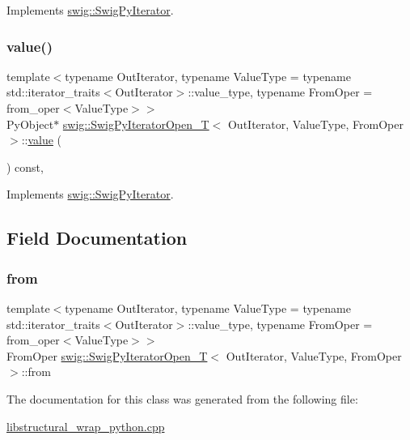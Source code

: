 Implements \hyperlink{structswig_1_1_swig_py_iterator_a8881170ecd7d9e674ef37eb16b2c9a7a}{swig\+::\+Swig\+Py\+Iterator}.

\mbox{\label{classswig_1_1_swig_py_iterator_open___t_aa219f4e29ccea747d23fdb68705a530d}} 
\subsubsection{\texorpdfstring{value()}{value()}}
{\footnotesize\ttfamily template$<$typename Out\+Iterator, typename Value\+Type = typename std\+::iterator\+\_\+traits$<$\+Out\+Iterator$>$\+::value\+\_\+type, typename From\+Oper = from\+\_\+oper$<$\+Value\+Type$>$$>$ \\
Py\+Object$\ast$ \hyperlink{classswig_1_1_swig_py_iterator_open___t}{swig\+::\+Swig\+Py\+Iterator\+Open\+\_\+T}$<$ Out\+Iterator, Value\+Type, From\+Oper $>$\+::\hyperlink{lp__lib_8h_a606ba870f46e132d61b5e2371014a998}{value} (\begin{DoxyParamCaption}{ }\end{DoxyParamCaption}) const\hspace{0.3cm}{\ttfamily [inline]}, {\ttfamily [virtual]}}



Implements \hyperlink{structswig_1_1_swig_py_iterator_a7ba184c8ea37f53dbd75b6678a23f20c}{swig\+::\+Swig\+Py\+Iterator}.



\subsection{Field Documentation}
\mbox{\label{classswig_1_1_swig_py_iterator_open___t_a1fdd8b3f85a163f2c5a0aa8bf4cb996d}} 
\subsubsection{\texorpdfstring{from}{from}}
{\footnotesize\ttfamily template$<$typename Out\+Iterator, typename Value\+Type = typename std\+::iterator\+\_\+traits$<$\+Out\+Iterator$>$\+::value\+\_\+type, typename From\+Oper = from\+\_\+oper$<$\+Value\+Type$>$$>$ \\
From\+Oper \hyperlink{classswig_1_1_swig_py_iterator_open___t}{swig\+::\+Swig\+Py\+Iterator\+Open\+\_\+T}$<$ Out\+Iterator, Value\+Type, From\+Oper $>$\+::from}



The documentation for this class was generated from the following file\+:\begin{DoxyCompactItemize}
\item 
\hyperlink{libstructural__wrap__python_8cpp}{libstructural\+\_\+wrap\+\_\+python.\+cpp}\end{DoxyCompactItemize}
